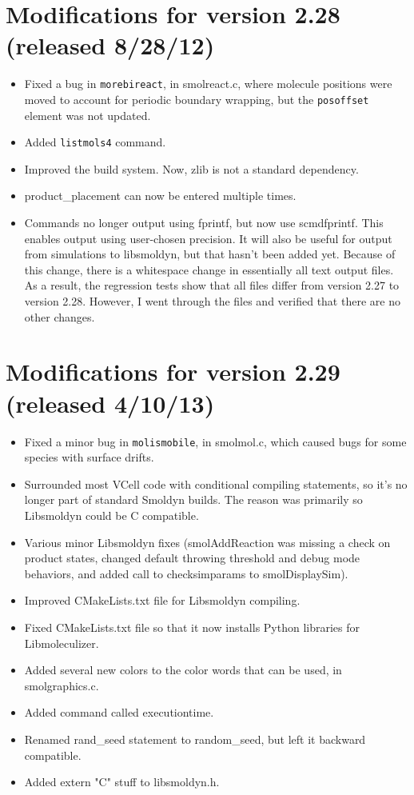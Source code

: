 \documentclass {scrbook}
\newcommand {\ttt} {\texttt}
\begin{document}
\section{Modifications for version 2.28 (released 8/28/12)}
\begin{itemize}
\item Fixed a bug in \ttt{morebireact}, in smolreact.c, where molecule positions were moved to account for periodic boundary wrapping, but the \ttt{posoffset} element was not updated.
\item Added \ttt{listmols4} command.
\item Improved the build system. Now, zlib is not a standard dependency.
\item product\_placement can now be entered multiple times.
\item Commands no longer output using fprintf, but now use scmdfprintf. This enables output using user-chosen precision. It will also be useful for output from simulations to libsmoldyn, but that hasn't been added yet. Because of this change, there is a whitespace change in essentially all text output files. As a result, the regression tests show that all files differ from version 2.27 to version 2.28. However, I went through the files and verified that there are no other changes.
\end{itemize}

\section{Modifications for version 2.29 (released 4/10/13)}
\begin{itemize}
\item Fixed a minor bug in \ttt{molismobile}, in smolmol.c, which caused bugs for some species with surface drifts.
\item Surrounded most VCell code with conditional compiling statements, so it's no longer part of standard Smoldyn builds. The reason was primarily so Libsmoldyn could be C compatible.
\item Various minor Libsmoldyn fixes (smolAddReaction was missing a check on product states, changed default throwing threshold and debug mode behaviors, and added call to checksimparams to smolDisplaySim).
\item Improved CMakeLists.txt file for Libsmoldyn compiling.
\item Fixed CMakeLists.txt file so that it now installs Python libraries for Libmoleculizer.
\item Added several new colors to the color words that can be used, in smolgraphics.c.
\item Added command called executiontime.
\item Renamed rand\_seed statement to random\_seed, but left it backward compatible.
\item Added extern "C" stuff to libsmoldyn.h.
\end{itemize}
\end{document}
